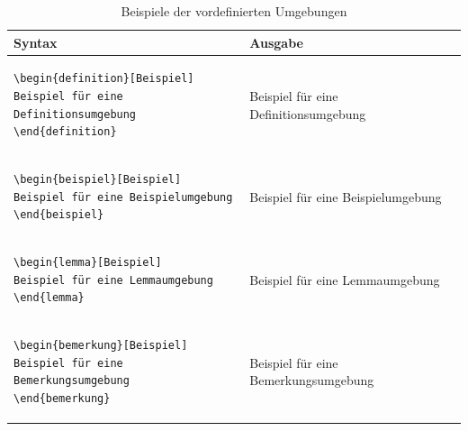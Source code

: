 \begin{table}[htbp]%
\centering
\caption{Beispiele der vordefinierten Umgebungen}
\begin{tabular}{p{8cm}p{7cm}}
Syntax & Ausgabe\\
\toprule
\begin{verbatim}
\begin{definition}[Beispiel]
Beispiel für eine Definitionsumgebung
\end{definition}
\end{verbatim}
&
\begin{definition}[Beispiel]
Beispiel für eine Definitionsumgebung
\end{definition}
\\
\begin{verbatim}
\begin{beispiel}[Beispiel]
Beispiel für eine Beispielumgebung
\end{beispiel}
\end{verbatim}
&
\begin{beispiel}[Beispiel]
Beispiel für eine Beispielumgebung
\end{beispiel}
\\
\begin{verbatim}
\begin{lemma}[Beispiel]
Beispiel für eine Lemmaumgebung
\end{lemma}
\end{verbatim}
&
\begin{lemma}[Beispiel]
Beispiel für eine Lemmaumgebung
\end{lemma}
\\
\begin{verbatim}
\begin{bemerkung}[Beispiel]
Beispiel für eine Bemerkungsumgebung
\end{bemerkung}
\end{verbatim}
&
\begin{bemerkung}[Beispiel]
Beispiel für eine Bemerkungsumgebung
\end{bemerkung}\\
\bottomrule
\end{tabular}
\end{table}



